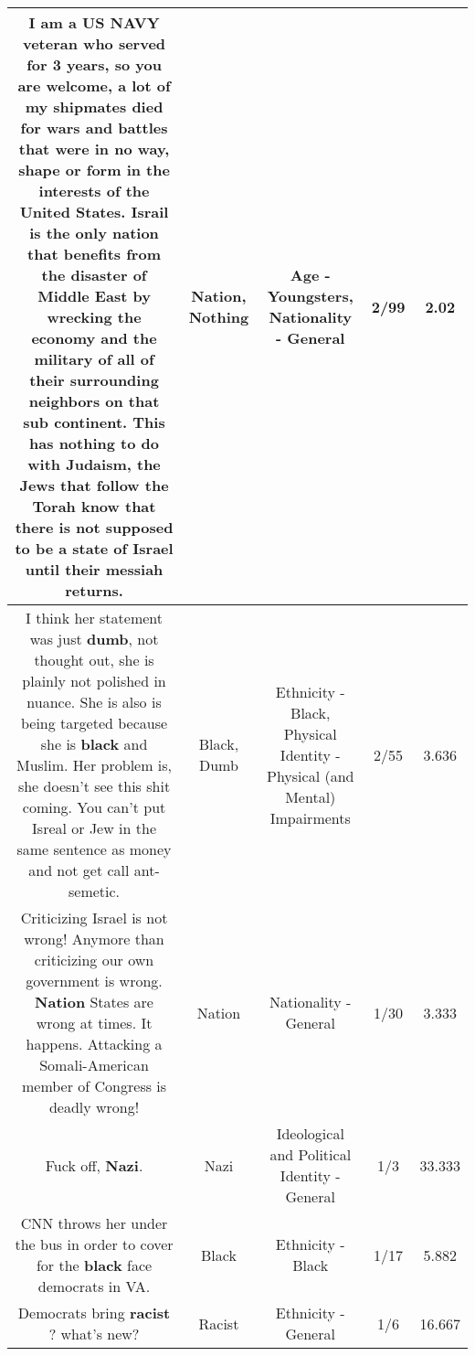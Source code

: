 \documentclass[11pt]{article}
\newlength\mylength
\begin{document}
\begin{center}
\begin{longtable}{|C{.65\mylength}|C{.30\mylength}|C{.12\mylength}|C{.12\mylength}|C{.12\mylength}|}
  \small I am a US NAVY veteran who served for 3 years, so you are welcome, a lot of my shipmates died for wars and battles that were in no way, shape or form in the interests of the United States.  Israil is the only \textbf{nation} that benefits from the disaster of Middle East by wrecking the economy and the military of all of their surrounding neighbors on that sub continent.  This has \textbf{nothing} to do with Judaism, the Jews that follow the Torah know that there is not supposed to be a state of Israel until their messiah returns.\normalsize   & Nation, Nothing & Age - Youngsters, Nationality - General & 2/99 & 2.02 \\  \hline
  \small I think her statement was just \textbf{dumb}, not thought out, she is plainly not polished in nuance.  She is also is being targeted because she is \textbf{black} and Muslim.  Her problem is, she doesn't see this shit coming.  You can't put Isreal or Jew in the same sentence as money and not get call ant-semetic.\normalsize   & Black, Dumb & Ethnicity - Black, Physical Identity - Physical (and Mental) Impairments & 2/55 & 3.636 \\  \hline
  \small Criticizing Israel is not wrong! Anymore than criticizing our own government is wrong. \textbf{Nation} States are wrong at times. It happens. Attacking a Somali-American member of Congress is deadly wrong!\normalsize   & Nation & Nationality - General & 1/30 & 3.333 \\  \hline
  \small Fuck off, \textbf{Nazi}.\normalsize   & Nazi &  Ideological and Political Identity - General & 1/3 & 33.333 \\  \hline
  \small CNN throws her under the bus in order to cover for the \textbf{black} face democrats in VA.\normalsize   & Black & Ethnicity - Black & 1/17 & 5.882 \\  \hline
  \small Democrats bring \textbf{racist} ? what's new?\normalsize   & Racist & Ethnicity - General & 1/6 & 16.667 \\  \hline

\end{longtable}
\end{center}
\end{document}
